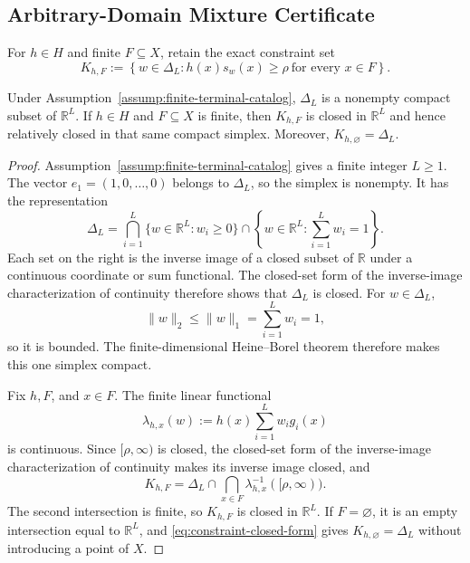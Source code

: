 \subsection{Arbitrary-Domain Mixture Certificate}
\label{app:arbitrary-domain-certificate}

For $h\in H$ and finite $F\subseteq X$, retain the exact constraint set
\begin{equation}\label{eq:finite-constraint-set}
K_{h,F}:=\left\{w\in\Delta_L:
h(x)s_w(x)\ge\rho\ \text{for every }x\in F\right\}.
\end{equation}

\begin{lemma}
\label{lem:step-004-compact-constraints}
Under Assumption~\ref{assump:finite-terminal-catalog}, $\Delta_L$ is a
nonempty compact subset of $\mathbb R^L$.  If $h\in H$ and
$F\subseteq X$ is finite, then $K_{h,F}$ is closed in $\mathbb R^L$ and
hence relatively closed in that same compact simplex.  Moreover,
$K_{h,\varnothing}=\Delta_L$.
\end{lemma}

\begin{proof}
Assumption~\ref{assump:finite-terminal-catalog} gives a finite integer
$L\ge1$.  The vector $e_1=(1,0,\ldots,0)$ belongs to $\Delta_L$, so the
simplex is nonempty.  It has the representation
\begin{equation}\label{eq:simplex-closed-form}
\Delta_L
=\bigcap_{i=1}^L\{w\in\mathbb R^L:w_i\ge0\}
\cap\left\{w\in\mathbb R^L:\sum_{i=1}^Lw_i=1\right\}.
\end{equation}
Each set on the right is the inverse image of a closed subset of $\mathbb R$
under a continuous coordinate or sum functional.  The closed-set form of the
inverse-image characterization of continuity
\citep[Theorem~4.8, by complements]{rudin1976principles} therefore shows that
$\Delta_L$ is closed.  For
$w\in\Delta_L$,
\[
\lVert w\rVert_2\le\lVert w\rVert_1
=\sum_{i=1}^Lw_i=1,
\]
so it is bounded.  The finite-dimensional Heine--Borel theorem
\citep[Theorem~2.41]{rudin1976principles} therefore makes this one simplex
compact.

Fix $h,F$, and $x\in F$.  The finite linear functional
\[
\lambda_{h,x}(w):=h(x)\sum_{i=1}^Lw_i g_i(x)
\]
is continuous.  Since $[\rho,\infty)$ is closed, the closed-set form of the
inverse-image characterization of continuity
\citep[Theorem~4.8, by complements]{rudin1976principles} makes its inverse
image closed, and
\begin{equation}\label{eq:constraint-closed-form}
K_{h,F}=\Delta_L\cap
\bigcap_{x\in F}\lambda_{h,x}^{-1}([\rho,\infty)).
\end{equation}
The second intersection is finite, so $K_{h,F}$ is closed in
$\mathbb R^L$.  If $F=\varnothing$, it is an empty intersection equal to
$\mathbb R^L$, and \eqref{eq:constraint-closed-form} gives
$K_{h,\varnothing}=\Delta_L$ without introducing a point of $X$.
\end{proof}

